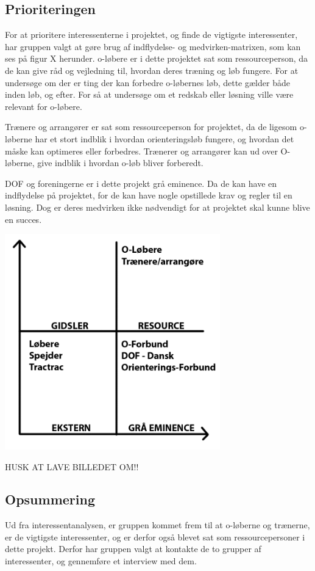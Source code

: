 \subsection{Prioriteringen}
For at prioritere interessenterne i projektet, og finde de vigtigste interessenter, har gruppen valgt at gøre brug af indflydelse- og medvirken-matrixen, som kan ses på figur X herunder.  
o-løbere er i dette projektet sat som ressourceperson, da de kan give råd og vejledning til, hvordan deres træning og løb fungere. For at undersøge om der er ting der kan forbedre o-løbernes løb, dette gælder både inden løb, og efter. For så at undersøge om et redskab eller løsning ville være relevant for o-løbere.  

Trænere og arrangører er sat som ressourceperson for projektet, da de ligesom o-løberne har et stort indblik i hvordan orienteringsløb fungere, og hvordan det måske kan optimeres eller forbedres. Trænerer og arrangører kan ud over O-løberne, give indblik i hvordan o-løb bliver forberedt.  

DOF og foreningerne er i dette projekt grå eminence. Da de kan have en indflydelse på projektet, for de kan have nogle opstillede krav og regler til en løsning. Dog er deres medvirken ikke nødvendigt for at projektet skal kunne blive en succes.   

\includegraphics[width=0.70\textwidth]{billeder/Medvirken-indflydelse}
\vspace{0.25cm}

HUSK AT LAVE BILLEDET OM!!



\subsection{Opsummering}
Ud fra interessentanalysen, er gruppen kommet frem til at o-løberne og trænerne, er de vigtigste interessenter, og er derfor også blevet sat som ressourcepersoner i dette projekt. Derfor har gruppen valgt at kontakte de to grupper af interessenter, og gennemføre et interview med dem. 

